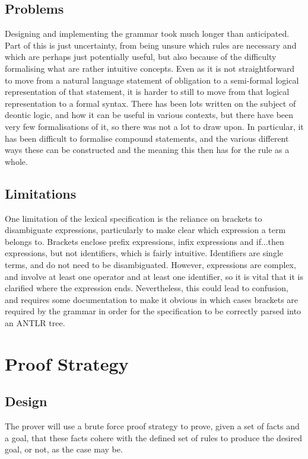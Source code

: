 \documentclass{l4proj}
\begin{document}
\subsection{Problems}
Designing and implementing the grammar took much longer than anticipated. Part of this is just uncertainty, from being unsure which rules are necessary and which are perhaps just potentially useful, but also because of the difficulty formalising what are rather intuitive concepts. Even as it is not straightforward to move from a natural language statement of obligation to a semi-formal logical representation of that statement, it is harder to still to move from that logical representation to a formal syntax. There has been lots written on the subject of deontic logic, and how it can be useful in various contexts, but there have been very few formalisations of it, so there was not a lot to draw upon. In particular, it has been difficult to formalise compound statements, and the various different ways these can be constructed and the meaning this then has for the rule as a whole.

\subsection{Limitations}
One limitation of the lexical specification is the reliance on brackets to disambiguate expressions, particularly to make clear which expression a term belongs to. Brackets enclose prefix expressions, infix expressions and if...then expressions, but not identifiers, which is fairly intuitive. Identifiers are single terms, and do not need to be disambiguated. However, expressions are complex, and involve at least one operator and at least one identifier, so it is vital that it is clarified where the expression ends. Nevertheless, this could lead to confusion, and requires some documentation to make it obvious in which cases brackets are required by the grammar in order for the specification to be correctly parsed into an ANTLR tree. 

\section{Proof Strategy}


\subsection{Design}
The prover will use a brute force proof strategy to prove, given a set of facts and a goal, that these facts cohere with the defined set of rules to produce the desired goal, or not, as the case may be. 
\end{document}
